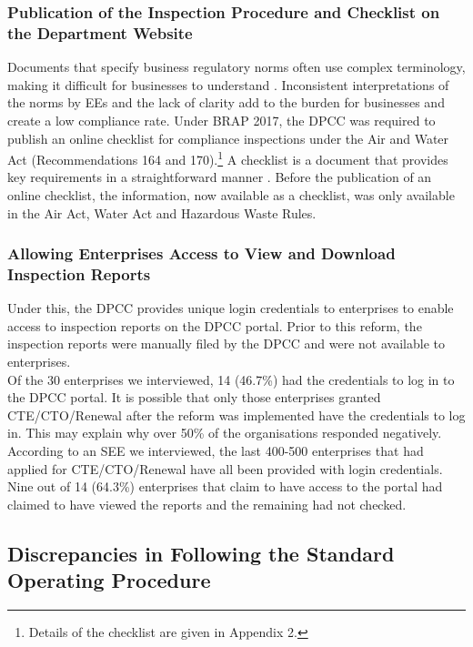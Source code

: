\documentclass[a4paper, 12pt, twoside]{article}
\begin{document}
	\subsubsection{ Publication of the Inspection Procedure and Checklist on the Department Website}
	
	Documents that specify business regulatory norms often use complex terminology, making it difficult for businesses to understand \parencite{OECD14}. Inconsistent interpretations of the norms by EEs and the lack of clarity add to the burden for businesses and create a low compliance rate. Under BRAP 2017, the DPCC was required to publish an online checklist for compliance inspections under the Air and Water Act (Recommendations 164 and 170).\footnote{Details of the checklist are given in Appendix 2.} A checklist is a document that provides key requirements in a straightforward manner \parencite{OECD14}. Before the publication of an online checklist, the information, now available as a checklist, was only available in the Air Act, Water Act and Hazardous Waste Rules. 
	
	\subsubsection{Allowing Enterprises Access to View and Download Inspection Reports}
	
	Under this, the DPCC provides unique login credentials to enterprises to enable access to inspection reports on the DPCC portal. Prior to this reform, the inspection reports were manually filed by the DPCC and were not available to enterprises. \\
	
	Of the 30 enterprises we interviewed, 14 (46.7\%) had the credentials to log in to the DPCC portal. It is possible that only those enterprises granted CTE/CTO/Renewal after the reform was implemented have the credentials to log in. This may explain why over 50\% of the organisations responded negatively. According to an SEE we interviewed, the last 400-500 enterprises that had applied for CTE/CTO/Renewal have all been provided with login credentials. \\
	
	Nine out of 14 (64.3\%) enterprises that claim to have access to the portal had claimed to have viewed the reports and the remaining had not checked. 
	
	\subsection{Discrepancies in Following the Standard Operating Procedure}
	
\end{document}

